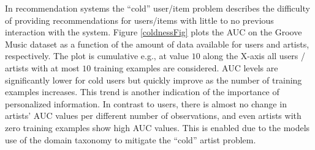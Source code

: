 


In recommendation systems the ``cold''  user/item problem describes the difficulty of
providing recommendations for users/items with little to no previous interaction with the system. 
Figure \ref{coldnessFig} plots the AUC on the Groove Music dataset as a function of the amount of data available for users and artists, respectively. The plot is cumulative e.g., at value $10$ along the X-axis all users / artists with at most $10$ training examples are considered. AUC levels are significantly lower for cold users but quickly improve as the number of training examples increases. This trend is another indication of the importance of personalized information. In contrast to users, there is almost no change in artists' AUC values per different number of observations, and even artists with zero training examples show high AUC values.
This is enabled due to the models use of the domain taxonomy to mitigate the ``cold'' artist problem. %




